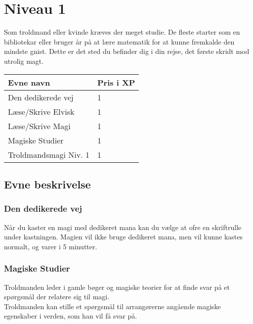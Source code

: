 \chapter{Niveau 1}
Som troldmand eller kvinde kræves der meget studie. De fleste starter som en bibliotekar eller bruger år på at lære matematik for at kunne fremkalde den mindste gnist. Dette er det sted du befinder dig i din rejse, det første skridt mod utrolig magt. 

\begin{table}[H]
    \centering
    \begin{tabular}{|p{}|p{}|}
    \rowcolor{cerulean!80}\hline
        Evne navn & Pris i XP \\\hline
        Den dedikerede vej & 1\\\hline
        Læse/Skrive Elvisk & 1\\\hline
        Læse/Skrive Magi & 1\\\hline
        Magiske Studier & 1\\\hline
        Troldmandsmagi Niv. 1 & 1\\\hline
    \end{tabular}
\end{table}

\section{Evne beskrivelse}

\subsection{Den dedikerede vej}
Når du kaster en magi med dedikeret mana kan du vælge at ofre en skriftrulle under kastningen. Magien vil ikke bruge dedikeret mana, men vil kunne kastes normalt, og varer i 5 minutter.





\subsection{Magiske Studier}
Troldmanden leder i gamle bøger og magiske teorier for at finde svar på et spørgsmål der relatere sig til magi.\\
Troldmanden kan stille et spørgsmål til arrangørerne angående magiske egenskaber i verden, som han vil få svar på.

